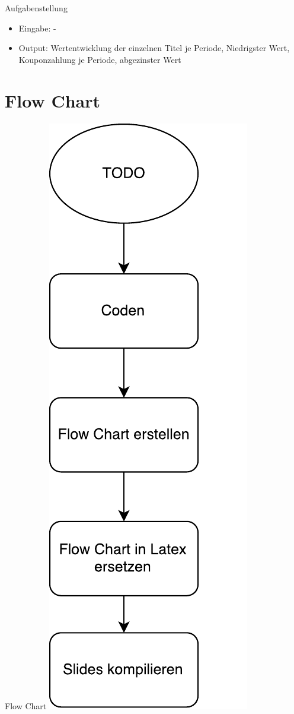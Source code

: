 \begin{frame}{Aufgabenstellung}
\begin{itemize}
  \item Eingabe: -
  \vspace{1cm}
  \item Output: Wertentwicklung der einzelnen Titel je Periode, Niedrigster Wert, Kouponzahlung je Periode, abgezinster Wert
\end{itemize}
\end{frame}

\section{Flow Chart}
\begin{frame}{Flow Chart}
	\centering
  	\includegraphics[scale=0.3]{FlowChartTodo.pdf}
\end{frame}


